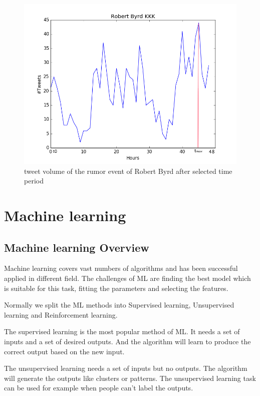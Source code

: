 \begin{figure}[!h]
\centering
\includegraphics[width=0.7\columnwidth]{images/Robert_Byrd_KKK.png}
\caption{tweet volume of the rumor event of Robert Byrd after selected time period}
\label{fig:KKK_part}
\end{figure}



\section{Machine learning } %
\label{sec:Maschine_learning}
\subsection{Machine learning Overview} %

 Machine learning covers vast numbers of algorithms and has been successful applied in different field. The challenges of ML are finding the best model which is suitable for this task, fitting the parameters and selecting the features. 
 
Normally we split the ML methods into Supervised learning, Unsupervised learning and Reinforcement learning\cite{russell2003artificial}. 

The supervised learning is the most popular method of ML. It needs a set of inputs and a set of desired outputs. And the algorithm will learn to produce the correct output based on the new input. 

The unsupervised learning needs a set of inputs but no outputs. The algorithm will generate the outputs like clusters or patterns. The unsupervised learning task can be used for example when people can't label the outputs. 
